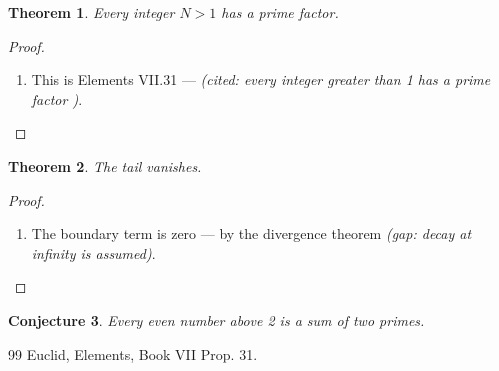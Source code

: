 \documentclass[11pt,a4paper]{article}
\theoremstyle{plain}
\newtheorem{theorem}{Theorem}
\newtheorem{conjecture}[theorem]{Conjecture}
\theoremstyle{definition}
\theoremstyle{remark}
\begin{document}
\begin{theorem}
Every integer $N > 1$ has a prime factor.

\end{theorem}
\begin{proof}
\begin{enumerate}
\item This is Elements VII.31 --- \emph{(cited: every integer greater than 1 has a prime factor \cite{euclid})}.
\end{enumerate}
\end{proof}
\begin{theorem}
The tail vanishes.

\end{theorem}
\begin{proof}
\begin{enumerate}
\item The boundary term is zero --- by the divergence theorem \emph{(gap: decay at infinity is assumed)}.
\end{enumerate}
\end{proof}
\begin{conjecture}
Every even number above 2 is a sum of two primes.

\end{conjecture}
\begin{thebibliography}{99}
 Euclid, Elements, Book VII Prop. 31.
\end{thebibliography}
\end{document}
